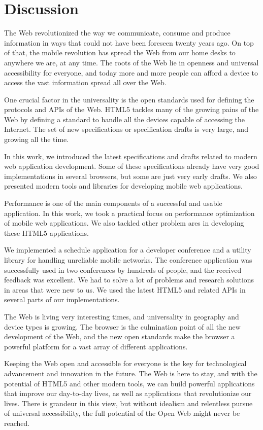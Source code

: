\chapter{Discussion}
\label{chapter:discussion}

The Web revolutionized the way we communicate, consume and produce
information in ways that could not have been foreseen twenty years
ago. On top of that, the mobile revolution has spread the Web from our
home desks to anywhere we are, at any time. The roots of the Web lie
in openness and universal accessibility for everyone, and today more
and more people can afford a device to access the vast information
spread all over the Web.

One crucial factor in the universality is the open standards used for
defining the protocols and APIs of the Web. HTML5 tackles many of the
growing pains of the Web by defining a standard to handle all the
devices capable of accessing the Internet. The set of new
specifications or specification drafts is very large, and growing all
the time.

In this work, we introduced the latest specifications and drafts
related to modern web application development. Some of these
specifications already have very good implementations in several
browsers, but some are just very early drafts. We also presented
modern tools and libraries for developing mobile web applications.

Performance is one of the main components of a successful and usable
application. In this work, we took a practical focus on performance
optimization of mobile web applications. We also tackled other problem
ares in developing these HTML5 applications.

We implemented a schedule application for a developer conference and a
utility library for handling unreliable mobile networks. The
conference application was successfully used in two conferences by
hundreds of people, and the received feedback was excellent. We had to
solve a lot of problems and research solutions in areas that were new
to us. We used the latest HTML5 and related APIs in several parts of
our implementations.

The Web is living very interesting times, and universality in
geography and device types is growing. The browser is the culmination
point of all the new development of the Web, and the new open
standards make the browser a powerful platform for a vast array of
different applications.

Keeping the Web open and accessible for everyone is the key for
technological advancement and innovation in the future. The Web is
here to stay, and with the potential of HTML5 and other modern tools,
we can build powerful applications that improve our day-to-day lives,
as well as applications that revolutionize our lives. There is
grandeur in this view, but without idealism and relentless pursue of
universal accessibility, the full potential of the Open Web might
never be reached.
